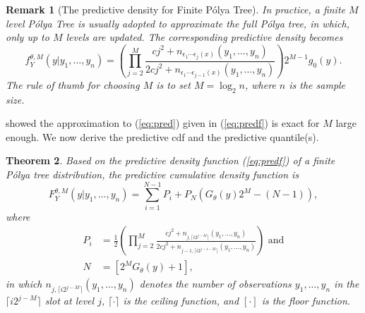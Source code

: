 \documentclass[12pt]{article}
\newtheorem{thm}{Theorem}[section]
\newtheorem{rmk}[thm]{Remark}
\newcommand{\polya}{P\'{o}lya}
\begin{document}
\begin{rmk}[The predictive density for Finite \polya{} Tree]
  In practice, a finite $M$ level \polya{} Tree is usually adopted to
  approximate the full \polya{} tree, in which, only up to $M$ levels
  are updated. The corresponding predictive density becomes
  \begin{equation}
    \label{eq:predf}
    f_Y^{\theta, M} (y|y_1, \ldots, y_n)  =  \left(
      \prod_{j=2}^M \frac{cj^2 + n_{\epsilon_1 \cdots \epsilon_j(x) }(y_1, \ldots, y_n)}{2cj^2
        + n_{\epsilon_1 \cdots \epsilon_{j-1}(x)}(y_1, \ldots, y_n)}
    \right)2^{M-1} g_0(y).
  \end{equation}
  The rule of thumb for choosing $M$ is to set $M=\log_2n$, where $n$
  is the sample size.
\end{rmk}

\citet{hanson2002} showed the approximation to (\ref{eq:pred}) given
in (\ref{eq:predf}) is exact for $M$ large enough.  We now derive the
predictive cdf and the predictive quantile(s).

\begin{thm}
  Based on the predictive density function (\ref{eq:predf}) of a
  finite \polya{} tree distribution, the predictive cumulative density
  function is
  \begin{equation}
    \label{eq:cdf}
    F^{\theta,M}_Y(y|y_1, \ldots, y_n) = \sum_{i=1}^{N-1} P_{i} + P_N
    \left( G_{\theta}(y)2^M -(N-1) \right),
  \end{equation}
  where
  \begin{align*}
    P_i &= \frac{1}{2} \left(\prod_{j=2}^M \frac{cj^2 + n_{j,\lceil
          i2^{j-M} \rceil}(y_1, \ldots, y_n)}{2cj^2 + n_{j-1,\lceil
          i2^{j-1-M} \rceil}(y_{1 },\ldots, y_n)} \right) \mbox{ and}\\
    N & = \left[ 2^{M } G_{\theta}(y) +1\right],
  \end{align*}
  in which $n_{j,\lceil i2^{j-M} \rceil}(y_1, \ldots, y_n)$ denotes
  the number of observations $y_1, \ldots, y_n$ in the $\lceil
  i2^{j-M} \rceil$ slot at level $j$, $\lceil \cdot \rceil$ is the
  ceiling function, and $[ \cdot ]$ is the floor function.
\end{thm}
\end{document}
